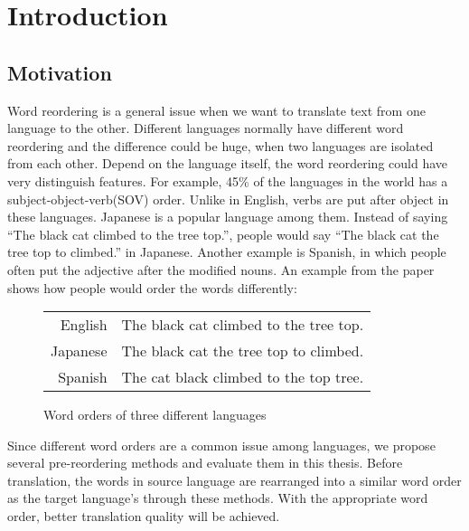
\chapter{Introduction}
\label{ch:Introduction}

\section{Motivation}
\label{ch:Introduction:sec:Motivation}

Word reordering is a general issue when we want to translate text from one language to the other. Different languages normally have different word reordering and the difference could be huge, when two languages are isolated from each other. Depend on the language itself, the word reordering could have very distinguish features. For example, 45\% of the languages in the world has a subject-object-verb(SOV) order. Unlike in English, verbs are put after object in these languages. Japanese is a popular language among them. Instead of saying ``The black cat climbed to the tree top.'', people would say ``The black cat the tree top to climbed.'' in Japanese. Another example is Spanish, in which people often put the adjective after the modified nouns. An example from the paper \cite{google} shows how people would order the words differently:

\begin{figure}[H]
\centering
\begin{tabular}{| r l |}
\hline 
English & The black cat climbed to the tree top. \Hstrut \Tstrut \\
\Hstrut Japanese & The black cat the tree top to climbed. \\
Spanish & The cat black climbed to the top tree. \Bstrut \\
\hline
\end{tabular}
\caption{Word orders of three different languages}
\end{figure}

Since different word orders are a common issue among languages, we propose several pre-reordering methods and evaluate them in this thesis. Before translation, the words in source language are rearranged into a similar word order as the target language's through these methods. With the appropriate word order, better translation quality will be achieved.

